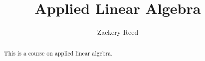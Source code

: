 \documentclass{xourse}
\title{Applied Linear Algebra}
\author{Zackery Reed}
\begin{document}
\begin{abstract}
    This is a course on applied linear algebra.
\end{abstract}
\maketitle

\sectionstyle
{}
\sectionstyle
{}
\end{document}
